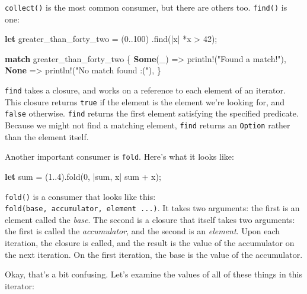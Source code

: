 \documentclass[a4paper,]{book}
\newenvironment{Shaded}{\begin{snugshade}}{\end{snugshade}}
\newcommand{\KeywordTok}[1]{\textcolor[rgb]{0.13,0.29,0.53}{\textbf{{#1}}}}
\newcommand{\DecValTok}[1]{\textcolor[rgb]{0.00,0.00,0.81}{{#1}}}
\newcommand{\StringTok}[1]{\textcolor[rgb]{0.31,0.60,0.02}{{#1}}}
\newcommand{\OtherTok}[1]{\textcolor[rgb]{0.56,0.35,0.01}{{#1}}}
\newcommand{\NormalTok}[1]{{#1}}
\begin{document}
\texttt{collect()} is the most common consumer, but there are others
too. \texttt{find()} is one:

\begin{Shaded}
\begin{Highlighting}[]
\KeywordTok{let} \NormalTok{greater_than_forty_two = (}\DecValTok{0.}\NormalTok{.}\DecValTok{100}\NormalTok{)}
                             \NormalTok{.find(|x| *x > }\DecValTok{42}\NormalTok{);}

\KeywordTok{match} \NormalTok{greater_than_forty_two \{}
    \KeywordTok{Some}\NormalTok{(_) => }\OtherTok{println!}\NormalTok{(}\StringTok{"Found a match!"}\NormalTok{),}
    \KeywordTok{None} \NormalTok{=> }\OtherTok{println!}\NormalTok{(}\StringTok{"No match found :("}\NormalTok{),}
\NormalTok{\}}
\end{Highlighting}
\end{Shaded}

\texttt{find} takes a closure, and works on a reference to each element
of an iterator. This closure returns \texttt{true} if the element is the
element we're looking for, and \texttt{false} otherwise. \texttt{find}
returns the first element satisfying the specified predicate. Because we
might not find a matching element, \texttt{find} returns an
\texttt{Option} rather than the element itself.

Another important consumer is \texttt{fold}. Here's what it looks like:

\begin{Shaded}
\begin{Highlighting}[]
\KeywordTok{let} \NormalTok{sum = (}\DecValTok{1.}\NormalTok{.}\DecValTok{4}\NormalTok{).fold(}\DecValTok{0}\NormalTok{, |sum, x| sum + x);}
\end{Highlighting}
\end{Shaded}

\texttt{fold()} is a consumer that looks like this:
\texttt{fold(base,\ \textbar{}accumulator,\ element\textbar{}\ ...)}. It
takes two arguments: the first is an element called the \emph{base}. The
second is a closure that itself takes two arguments: the first is called
the \emph{accumulator}, and the second is an \emph{element}. Upon each
iteration, the closure is called, and the result is the value of the
accumulator on the next iteration. On the first iteration, the base is
the value of the accumulator.

Okay, that's a bit confusing. Let's examine the values of all of these
things in this iterator:
\end{document}
